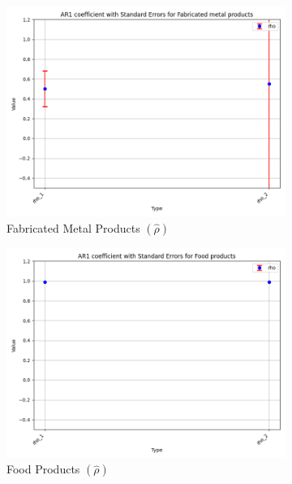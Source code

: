 \documentclass{article}
\begin{document}
\begin{figure}[ht!]
    \begin{subfigure}[t]{0.32\textwidth}
        \centering
        \includegraphics[width=\textwidth]{figure/empirical_ar1_mixture_kmshare_ciiu_rho_with_error_bars_Fabricated metal products.png}
        \caption{Fabricated Metal Products $(\hat\rho)$}
    \end{subfigure}
    \begin{subfigure}[t]{0.32\textwidth}
        \centering
        \includegraphics[width=\textwidth]{figure/empirical_ar1_mixture_kmshare_ciiu_rho_with_error_bars_Food products.png}
        \caption{Food Products $(\hat\rho)$}
    \end{subfigure}
    \begin{subfigure}[t]{0.32\textwidth}

\end{subfigure}
\end{figure}
\end{document}
